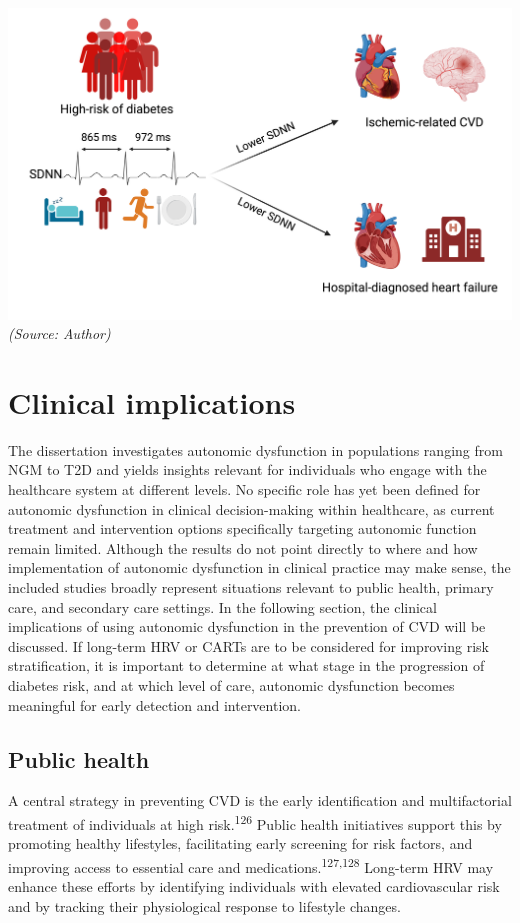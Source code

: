 \documentclass[
  letterpaper,
  headsepline=true,
  open=any]{scrbook}
\begin{document}
\includegraphics{images/ADD_PRO_IMG.png} \emph{(Source: Author)}

\hypertarget{clinical-implications}{%
\section{Clinical implications}\label{clinical-implications}}

The dissertation investigates autonomic dysfunction in populations
ranging from NGM to T2D and yields insights relevant for individuals who
engage with the healthcare system at different levels. No specific role
has yet been defined for autonomic dysfunction in clinical
decision-making within healthcare, as current treatment and intervention
options specifically targeting autonomic function remain limited.
Although the results do not point directly to where and how
implementation of autonomic dysfunction in clinical practice may make
sense, the included studies broadly represent situations relevant to
public health, primary care, and secondary care settings. In the
following section, the clinical implications of using autonomic
dysfunction in the prevention of CVD will be discussed. If long-term HRV
or CARTs are to be considered for improving risk stratification, it is
important to determine at what stage in the progression of diabetes
risk, and at which level of care, autonomic dysfunction becomes
meaningful for early detection and intervention.

\hypertarget{public-health}{%
\subsection{Public health}\label{public-health}}

A central strategy in preventing CVD is the early identification and
multifactorial treatment of individuals at high
risk.\textsuperscript{126} Public health initiatives support this by
promoting healthy lifestyles, facilitating early screening for risk
factors, and improving access to essential care and
medications.\textsuperscript{127,128} Long-term HRV may enhance these
efforts by identifying individuals with elevated cardiovascular risk and
by tracking their physiological response to lifestyle changes.
\end{document}
